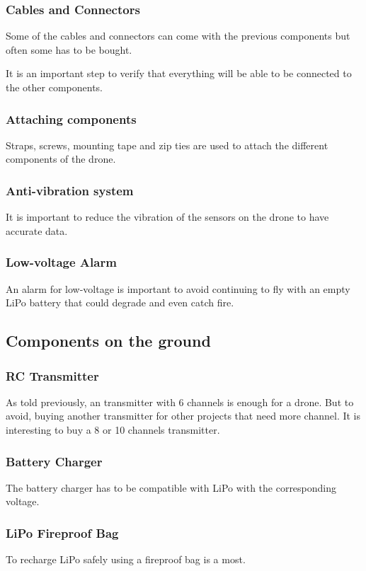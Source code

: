 \subsubsection{Cables and Connectors}
Some of the cables and connectors can come with the previous components but often some has to be bought.

It is an important step to verify that everything will be able to be connected to the other components.

\subsubsection{Attaching components}
Straps, screws, mounting tape and zip ties are used to attach the different components of the drone.

\subsubsection{Anti-vibration system}
It is important to reduce the vibration of the sensors on the drone to have accurate data.

\subsubsection{Low-voltage Alarm}
An alarm for low-voltage is important to avoid continuing to fly with an empty LiPo battery that could degrade and even catch fire.

\subsection{Components on the ground}

\subsubsection{RC Transmitter}
As told previously, an transmitter with 6 channels is enough for a drone. But to avoid, buying another transmitter for other projects that need more channel. It is interesting to buy a 8 or 10 channels transmitter.

\subsubsection{Battery Charger}
The battery charger has to be compatible with LiPo with the corresponding voltage.

\subsubsection{LiPo Fireproof Bag}
To recharge LiPo safely using a fireproof bag is a most.

